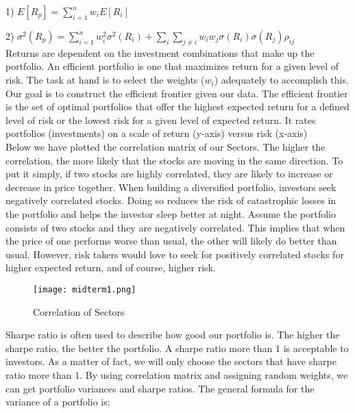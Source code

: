 \documentclass[11pt, oneside]{article}   	%
\begin{document}
  1) $E[R_p] = \sum_{i=1}^{n}w_iE[R_i]$ \
  
  2) $\sigma^2(R_p) = \sum_{i=1}^{n}w_i^2\sigma^2(R_i)+\sum_i\sum_{j\neq i}w_iw_j\sigma(R_i)\sigma(R_j)\rho_{ij}$ \\

Returns are dependent on the investment combinations that make up the portfolio. An efficient portfolio is one that maximizes return for a given level of risk. The task at hand is to select the weights ($w_i$) adequately to accomplish this. Our goal is to construct the efficient frontier given our data. The efficient frontier is the set of optimal portfolios that offer the highest expected return for a defined level of risk or the lowest risk for a given level of expected return. It rates portfolios (investments) on a scale of return (y-axis) versus risk (x-axis)\\

Below we have plotted the correlation matrix of our Sectors. The higher the correlation, the more likely that the stocks are moving in the same direction. To put it simply, if two stocks are highly correlated, they are likely to increase or decrease in price together. When building a diversified portfolio, investors seek negatively correlated stocks. Doing so reduces the risk of catastrophic losses in the portfolio and helps the investor sleep better at night. Assume the portfolio consists of two stocks and they are negatively correlated. This implies that when the price of one performs worse than usual, the other will likely do better than usual. However, risk takers would love to seek for positively correlated stocks for higher expected return, and of course, higher risk.\\

\begin{figure}[!h] %
   \centering
   \texttt{[image: midterm1.png]} 
  \caption{Correlation of Sectors}
\end{figure}

\FloatBarrier

Sharpe ratio is often used to describe how good our portfolio is. The higher the sharpe ratio, the better the portfolio. A sharpe ratio more than 1 is acceptable to investors. As a matter of fact, we will only choose the sectors that have sharpe ratio more than 1. By using correlation matrix and assigning random weights, we can get portfolio variances and sharpe ratios.  The general formula for the variance of a portfolio is:\\
\end{document}
